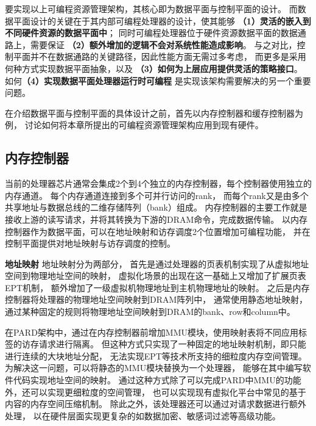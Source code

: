 要实现以上可编程资源管理架构，其核心即为数据平面与控制平面的设计。
而数据平面设计的关键在于其内部可编程处理器的设计，使其能够
\textbf{（1）灵活的嵌入到不同硬件资源的数据平面中}；
同时可编程处理器位于硬件资源数据平面的数据通路上，需要保证
\textbf{（2）额外增加的逻辑不会对系统性能造成影响}。
与之对比，控制平面并不在数据通路的关键路径，因此性能方面无需过多考虑，
而更多是采用何种方式实现数据平面抽象，以及
\textbf{（3）如何为上层应用提供灵活的策略接口}。
如何\textbf{（4）实现数据平面处理器运行时可编程}
是实现该架构需要解决的另一个重要问题。

在介绍数据平面与控制平面的具体设计之前，首先以内存控制器和缓存控制器为例，
讨论如何将本章所提出的可编程资源管理架构应用到现有硬件。


\subsection{内存控制器}
当前的处理器芯片通常会集成2个到4个独立的内存控制器，每个控制器使用独立的内存通道。
每个内存通道连接到多个可并行访问的rank，
而每个rank又是由多个共享地址与数据总线的二维存储阵列（bank）组成。
内存控制器的主要工作就是接收上游的读写请求，并将其转换为下游的DRAM命令，完成数据传输。
以内存控制器作为数据平面，可以在地址映射和访存调度2个位置增加可编程功能，
并在控制平面提供对地址映射与访存调度的控制。

\textbf{地址映射}\quad
地址映射分为两部分，
首先是通过处理器的页表机制实现了从虚拟地址空间到物理地址空间的映射，
虚拟化场景的出现在这一基础上又增加了扩展页表EPT机制，
额外增加了一级虚拟机物理地址到主机物理地址的映射。
之后是内存控制器将处理器的物理地址空间映射到DRAM阵列中，
通常使用静态地址映射，通过某种固定的规则将物理地址空间映射到DRAM的bank、row和column中。

在PARD架构中，通过在内存控制器前增加MMU模块，使用映射表将不同应用标签的访存请求进行隔离。
但这种方式只实现了一种固定的地址映射机制，即只能进行连续的大块地址分配，
无法实现EPT等技术所支持的细粒度内存空间管理。
为解决这一问题，可以将静态的MMU模块替换为一个处理器，
能够在其中编写软件代码实现地址空间的映射。
通过这种方式除了可以完成PARD中MMU的功能外，还可以实现更细粒度的空间管理，
也可以实现现有虚拟化平台中常见的基于内容的内存空间压缩机制。
除此之外，该处理器还可以通过对请求数据进行额外处理，
以在硬件层面实现更复杂的如数据加密、敏感词过滤等高级功能。


